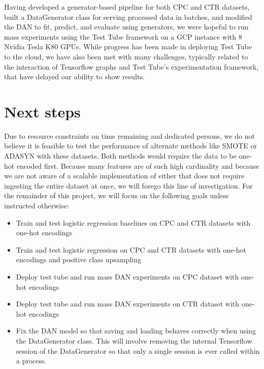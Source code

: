 \documentclass{proc}
\begin{document}
Having developed a generator-based pipeline for both CPC and CTR datasets, built a DataGenerator class for serving processed data in batches, and modified the DAN to fit, predict, and evaluate using generators, we were hopeful to run mass experiments using the Test Tube framework on a GCP instance with 8 Nvidia Tesla K80 GPUs. While progress has been made in deploying Test Tube to the cloud, we have also been met with many challenges, typically related to the interaction of Tensorflow graphs and Test Tube's experimentation framework, that have delayed our ability to show results.

\section{Next steps}

Due to resource constraints on time remaining and dedicated persons, we do not believe it is feasible to test the performance of alternate methods like SMOTE or ADASYN with these datasets. Both methods would require the data to be one-hot encoded first. Because many features are of such high cardinality and because we are not aware of a scalable implementation of either that does not require ingesting the entire dataset at once, we will forego this line of investigation. For the remainder of this project, we will focus on the following goals unless instructed otherwise:

\begin{itemize}
\item{Train and test logistic regression baselines on CPC and CTR datasets with one-hot encodings}
\item{Train and test logistic regression on CPC and CTR datasets with one-hot encodings and positive class upsampling}
\item{Deploy test tube and run mass DAN experiments on CPC dataset with one-hot encodings}
\item{Deploy test tube and run mass DAN experiments on CTR dataset with one-hot encodings}
\item{Fix the DAN model so that saving and loading behaves correctly when using the DataGenerator class. This will involve removing the internal Tensorflow session of the DataGenerator so that only a single session is ever called within a process.}
\end{itemize}
\end{document}
